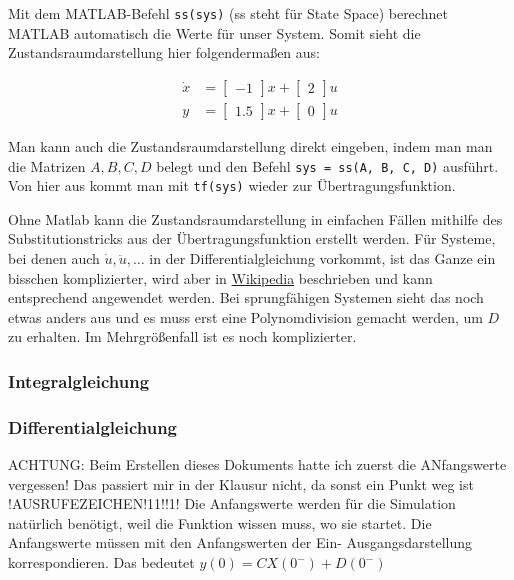 Mit dem MATLAB-Befehl \texttt{ss(sys)} (ss steht für State Space) berechnet MATLAB automatisch die Werte für unser System. Somit sieht die Zustandsraumdarstellung hier folgendermaßen aus:

\begin{subequations}
    \begin{align}
        \dot x & = \begin{bmatrix}
            -1
        \end{bmatrix}x + \begin{bmatrix}
            2
        \end{bmatrix}u \\
        y & = \begin{bmatrix}
            1.5
        \end{bmatrix}x + \begin{bmatrix}
            0
        \end{bmatrix}u
    \end{align}
\end{subequations}


Man kann auch die Zustandsraumdarstellung direkt eingeben, indem man man die Matrizen $A, B, C, D$ belegt und den Befehl \texttt{sys = ss(A, B, C, D)} ausführt. Von hier aus kommt man mit \texttt{tf(sys)} wieder zur Übertragungsfunktion.

Ohne Matlab kann die Zustandsraumdarstellung in einfachen Fällen mithilfe des Substitutionstricks aus der Übertragungsfunktion erstellt werden. Für Systeme, bei denen auch $\dot u, \ddot u, \ldots$ in der Differentialgleichung vorkommt, ist das Ganze ein bisschen komplizierter, wird aber in \href{https://de.wikipedia.org/wiki/Zustandsraumdarstellung#Regelungsnormalform}{Wikipedia} beschrieben und kann entsprechend angewendet werden. Bei sprungfähigen Systemen sieht das noch etwas anders aus und es muss erst eine Polynomdivision gemacht werden, um $D$ zu erhalten. Im Mehrgrößenfall ist es noch komplizierter.

\subsubsection{Integralgleichung}
\subsubsection{Differentialgleichung}

ACHTUNG: Beim Erstellen dieses Dokuments hatte ich zuerst die ANfangswerte vergessen! Das passiert mir in der Klausur nicht, da sonst ein Punkt weg ist !AUSRUFEZEICHEN!11!!1!
Die Anfangswerte werden für die Simulation natürlich benötigt, weil die Funktion wissen muss, wo sie startet.
Die Anfangswerte müssen mit den Anfangswerten der Ein-  Ausgangsdarstellung korrespondieren. 
Das bedeutet $y(0) = CX(0^-) + D(0^-)$

